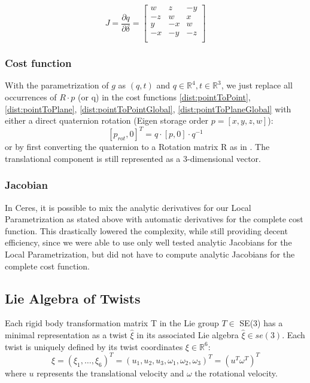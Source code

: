 \documentclass[12pt, a4paper]{article}
\begin{document}
\begin{equation}
J = \frac{\partial q}{\partial \delta} =
\begin{bmatrix}
 w &  z & -y \\ 
-z &  w &  x \\ 
 y & -x &  w \\
-x & -y & -z \\
\end{bmatrix} 
\label{eq:quaternionJacobian}
\end{equation}

\subsubsection{Cost function}
With the parametrization of $g$ as $(q,t)$ and $q \in \mathbb{R}^4, t \in \mathbb{R}^3$, we just replace all occurrences of $R \cdot p$ (or q) in the cost functions \eqref{dist:pointToPoint}, \eqref{dist:pointToPlane}, \eqref{dist:pointToPointGlobal}, \eqref{dist:pointToPlaneGlobal} with either a direct quaternion rotation (Eigen storage order $p = [x, y, z, w]$):
\[
[p_{rot},0]^T = q \cdot [p,0] \cdot q^{-1} 
\]
or by first converting the quaternion to a Rotation matrix R as in \cite{diebel2006representing}.
The translational component is still represented as a 3-dimensional vector.

\subsubsection{Jacobian}
In Ceres, it is possible to mix the analytic derivatives for our Local Parametrization as stated above with automatic derivatives for the complete cost function. This drastically lowered the complexity, while still providing decent efficiency, since we were able to use only well tested analytic Jacobians for the Local Parametrization, but did not have to compute analytic Jacobians for the complete cost function.

\subsection{Lie Algebra of Twists}
Each rigid body transformation matrix T in the Lie group $T \in$ SE(3) has a minimal representation as a twist $\hat\xi$ in its associated Lie algebra $\hat\xi \in se(3)$. Each twist is uniquely defined by its twist coordinates $\xi \in \mathbb{R}^6$:
\[
\xi = (\xi_1, \dots, \xi_6)^T = (u_1, u_2, u_3,\omega_1, \omega_2, \omega_3)^T = (u^T \omega^T)^T
\]
where $u$ represents the translational velocity and $\omega$ the rotational velocity.
\end{document}
